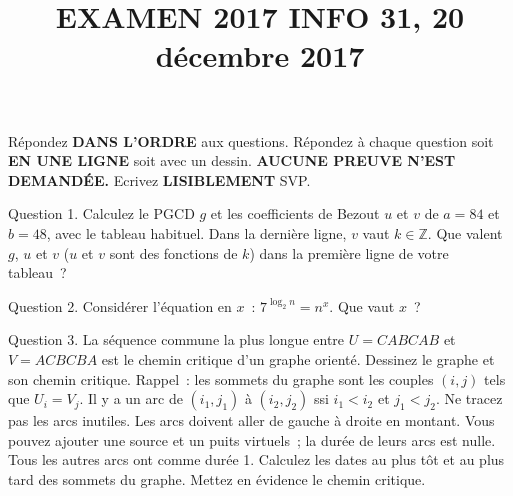 \documentclass[a4paper,12pt]{article}
\def\Z{\mathbb{Z}}
\begin{document}
\title{EXAMEN 2017 INFO 31, 20 décembre 2017}
\date{}
\maketitle
Répondez {\bf DANS L'ORDRE} aux questions. Répondez à chaque question soit {\bf EN UNE LIGNE} soit avec un dessin. {\bf AUCUNE PREUVE N'EST DEMANDÉE.} Ecrivez 
{\bf LISIBLEMENT} SVP.

Question 1. Calculez le PGCD $g$ et les coefficients de Bezout $u$ et $v$ de $a=84$ et $b=48$, avec le tableau habituel.
Dans la dernière ligne,  $v$ vaut $k\in\Z$.
Que valent $g$,  $u$ et $v$ ($u$ et $v$ sont des fonctions de $k$) dans la première ligne de votre tableau~? 

Question 2. Considérer l'équation en $x$~: $7^{\log_2 n}=n^x$.  Que vaut $x$~?

Question 3. La séquence commune la plus longue entre $U=CABCAB$ et $V=ACBCBA$ 
est le chemin critique d'un graphe orienté. Dessinez le graphe et son chemin critique.
Rappel~: les sommets
du graphe sont les couples $(i, j)$ tels que $U_i=V_j$. Il y a un arc  de $(i_1, j_1)$ à
$(i_2, j_2)$ ssi $i_1 < i_2$ et $j_1< j_2$. Ne tracez pas les arcs inutiles. 
Les arcs doivent aller de gauche à droite en montant.
Vous pouvez ajouter une source et un puits virtuels~; la durée de leurs arcs est nulle.
Tous les autres arcs ont comme durée 1.
Calculez les dates au plus tôt et au plus tard des sommets du graphe. Mettez en évidence le chemin critique.
\end{document}
